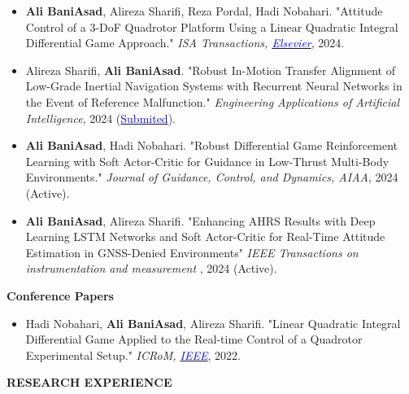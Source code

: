 \documentclass[12pt]{article}
\begin{document}
\begin{itemize} \itemsep -2pt %
	\item \textbf{Ali BaniAsad}, Alireza Sharifi, Reza Pordal, Hadi Nobahari. "Attitude Control of a 3-DoF Quadrotor Platform Using a Linear Quadratic Integral Differential Game Approach." \textit{ISA Transactions,
        \href{https://doi.org/10.1016/j.isatra.2024.03.005}{\textcolor{blue}{Elsevier}}}, 2024.
	\item Alireza Sharifi, \textbf{Ali BaniAsad}. "Robust In-Motion Transfer Alignment of Low-Grade Inertial Navigation Systems with Recurrent Neural Networks in the Event of Reference Malfunction." \textit{Engineering Applications of Artificial Intelligence}, 2024
	(\href{https://drive.google.com/file/d/19qd1IjmCQMv2Alldh55oYQSTPr03vjJL/view?usp=sharing}{\textcolor{blue}{Submited}}).
	\item \textbf{Ali BaniAsad}, Hadi Nobahari. "Robust Differential Game Reinforcement Learning with Soft Actor-Critic for Guidance in Low-Thrust Multi-Body Environments." \textit{Journal of Guidance, Control, and Dynamics,
	AIAA}, 2024 (Active).
	\item \textbf{Ali BaniAsad}, Alireza Sharifi. "Enhancing AHRS Results with Deep Learning LSTM Networks and Soft Actor-Critic for Real-Time Attitude Estimation in GNSS-Denied Environments"
	\textit{IEEE Transactions on instrumentation and measurement
}, 2024 (Active).
\end{itemize}

\vspace{0.2in} %
\noindent
{\bfseries Conference Papers}

\vspace{6pt}
\begin{itemize} \itemsep -2pt %
	\item Hadi Nobahari,  \textbf{Ali BaniAsad}, Alireza Sharifi. "Linear Quadratic Integral Differential Game Applied to the Real-time Control of a Quadrotor Experimental Setup." \textit{ICRoM, \href{https://doi.org/10.1109/ICRoM57054.2022.10025263}{\textcolor{blue}{IEEE}}}, 2022.
\end{itemize}

\vspace{0.2in} %


\vspace{-4pt}
\begin{center}
	{\noindent \bfseries RESEARCH EXPERIENCE} %
\end{center}
\end{document}
